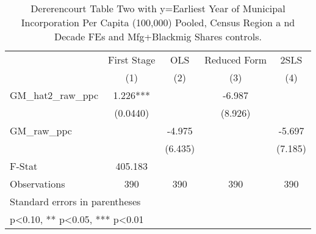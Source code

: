 \begin{table}[htbp]\centering
\def\sym#1{\ifmmode^{#1}\else\(^{#1}\)\fi}
\caption{Dererencourt Table Two with y=Earliest Year of Municipal Incorporation Per Capita (100,000) Pooled, Census Region a nd Decade FEs and Mfg+Blackmig Shares controls.}
\begin{tabular}{l*{4}{c}}
\toprule
                    & First Stage   &         OLS   &Reduced Form   &        2SLS   \\
                    &\multicolumn{1}{c}{(1)}   &\multicolumn{1}{c}{(2)}   &\multicolumn{1}{c}{(3)}   &\multicolumn{1}{c}{(4)}   \\
\midrule
GM\_hat2\_raw\_ppc     &       1.226***&               &      -6.987   &               \\
                    &    (0.0440)   &               &     (8.926)   &               \\
\addlinespace
GM\_raw\_ppc          &               &      -4.975   &               &      -5.697   \\
                    &               &     (6.435)   &               &     (7.185)   \\
\midrule
F-Stat              &     405.183   &               &               &               \\
Observations        &         390   &         390   &         390   &         390   \\
\bottomrule
\multicolumn{5}{l}{\footnotesize Standard errors in parentheses}\\
\multicolumn{5}{l}{\footnotesize * p<0.10, ** p<0.05, *** p<0.01}\\
\end{tabular}
\end{table}

